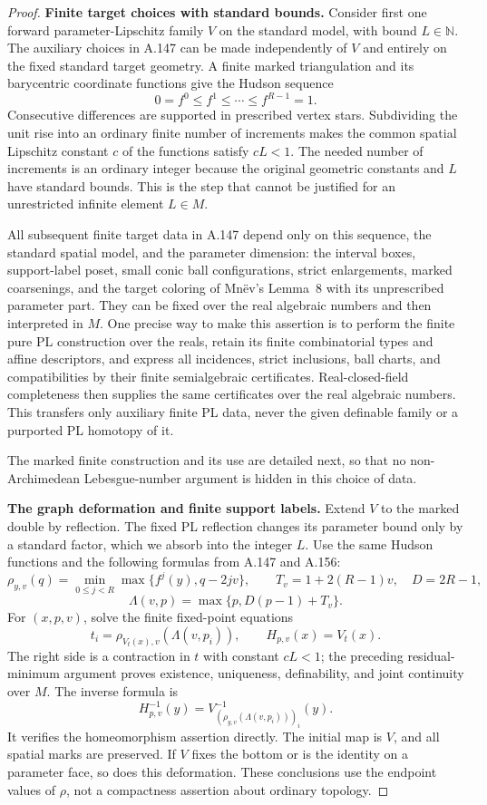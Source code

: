 \begin{proof}
\textbf{Finite target choices with standard bounds.}\quad
Consider first one forward parameter-Lipschitz family $V$
on the standard model, with bound $L\in\mathbb N$.
The auxiliary choices in A.147 can be made independently of
$V$ and entirely on the fixed standard target geometry.
A finite marked triangulation and its barycentric coordinate
functions give the Hudson sequence
\[
 0=f^0\le f^1\le\cdots\le f^{R-1}=1.
\]
Consecutive differences are supported in prescribed vertex
stars. Subdividing the unit rise into an ordinary finite
number of increments makes the common spatial Lipschitz
constant $c$ of the functions satisfy $cL<1$.
The needed number of increments is an ordinary integer
because the original geometric constants and $L$ have
standard bounds. This is the step that cannot be justified
for an unrestricted infinite element $L\in M$.

All subsequent finite target data in A.147 depend only on
this sequence, the standard spatial model, and the parameter
dimension: the interval boxes, support-label poset, small
conic ball configurations, strict enlargements, marked
coarsenings, and the target coloring of Mn\"ev's Lemma~8
with its unprescribed parameter part. They can be fixed over
the real algebraic numbers and then interpreted in $M$.
One precise way to make this assertion is to perform the
finite pure PL construction over the reals, retain its
finite combinatorial types and affine descriptors, and
express all incidences, strict inclusions, ball charts, and
compatibilities by their finite semialgebraic certificates.
Real-closed-field completeness then supplies the same
certificates over the real algebraic numbers. This transfers
only auxiliary finite PL data, never the given definable
family or a purported PL homotopy of it.

The marked finite construction and its use are detailed next,
so that no non-Archimedean Lebesgue-number argument is hidden
in this choice of data.


\textbf{The graph deformation and finite support labels.}\quad
Extend $V$ to the marked double by reflection. The fixed PL
reflection changes its parameter bound only by a standard
factor, which we absorb into the integer $L$. Use the same
Hudson functions and the following formulas from A.147 and
A.156:
\[
 \rho_{y,v}(q)=\min_{0\leq j<R}
       \max\{f^j(y),q-2jv\},\qquad
 T_v=1+2(R-1)v,\quad D=2R-1,
\]
\[
 \Lambda(v,p)=\max\{p,D(p-1)+T_v\}.
\]
For $(x,p,v)$, solve the finite fixed-point equations
\[
 t_i=\rho_{V_t(x),v}(\Lambda(v,p_i)),\qquad
 H_{p,v}(x)=V_t(x).
 \tag{159.3}
\]
The right side is a contraction in $t$ with constant $cL<1$;
the preceding residual-minimum argument proves existence,
uniqueness, definability, and joint continuity over $M$.
The inverse formula is
\[
 H_{p,v}^{-1}(y)=
 V^{-1}_{(\rho_{y,v}(\Lambda(v,p_i)))_i}(y).
 \tag{159.4}
\]
It verifies the homeomorphism assertion directly. The initial
map is $V$, and all spatial marks are preserved. If $V$ fixes
the bottom or is the identity on a parameter face, so does
this deformation. These conclusions use the endpoint values
of $\rho$, not a compactness assertion about ordinary topology.


\end{proof}
